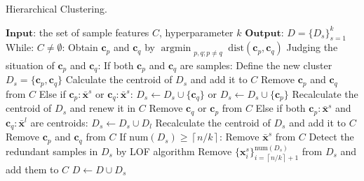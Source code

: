 \documentclass[final,3p,times]{elsarticle}
\begin{document}
 \begin{algorithm}
  \caption{Hierarchical Clustering.}\label{alg:alg1}
  \begin{algorithmic}
  \STATE 
  \STATE $\mathbf{Input}$: the set of sample features $C$, hyperparameter $k$
  \STATE $\mathbf{Output}$: $D=\{D_s\}_{s=1}^k$
  \vspace{5pt} %
  \STATE While: $C\neq\emptyset$:
  \STATE \hspace{0.5cm}Obtain $\boldsymbol{c}_p$ and $\boldsymbol{c}_q$ by $\mathop{\text{argmin}}_{\substack{p, q ; p \neq  {q}}}\text{dist}(\boldsymbol{c}_p,\boldsymbol{c}_q)$
  \STATE \hspace{0.5cm}Judging the situation of $\boldsymbol{c}_p$ and $\boldsymbol{c}_q$:
  \STATE \hspace{1.0cm}If both $\boldsymbol{c}_p$ and $\boldsymbol{c}_q$ are samples:
  \STATE \hspace{1.5cm}Define the new cluster $D_s=\{\boldsymbol{c}_p,\boldsymbol{c}_q\}$
  \STATE \hspace{1.5cm}Calculate the centroid of $D_s$ and add it to $C$
  \STATE \hspace{1.5cm}Remove $\boldsymbol{c}_p$ and $\boldsymbol{c}_q$ from $C$
  \STATE \hspace{1.0cm}Else if $\boldsymbol{c}_p:\bar{\boldsymbol{x}}^s$ or $\boldsymbol{c}_q:{\bar{\boldsymbol{x}}^s}$:
  \STATE \hspace{1.5cm}$D_s\leftarrow D_s {\cup} \{{\boldsymbol{c}}_q\}$ or $D_s\leftarrow D_s {\cup} \{{\boldsymbol{c}}_p\}$
  \STATE \hspace{1.5cm}Recalculate the centroid of $D_s$ and renew it in $C$
  \STATE \hspace{1.5cm}Remove $\boldsymbol{c}_q$ or $\boldsymbol{c}_p$ from $C$
  \STATE \hspace{1.0cm}Else if both $\boldsymbol{c}_p:{\bar{\boldsymbol{x}}^s}$ and $\boldsymbol{c}_q:{\bar{\boldsymbol{x}}^l}$ are centroids:
  \STATE \hspace{1.5cm}$D_s \leftarrow D_s  {\cup}  D_l$
  \STATE \hspace{1.5cm}Recalculate the centroid of $D_s$ and add it to $C$
  \STATE \hspace{1.5cm}Remove $\boldsymbol{c}_p$ and $\boldsymbol{c}_q$ from $C$
  \STATE \hspace{0.5cm}If $\text{num}(D_s)\ge \left\lceil n/k\right\rceil$:
  \STATE \hspace{1.0cm}Remove $\bar{\boldsymbol{x}}^s$ from $C$
  \STATE \hspace{1.0cm}Detect the redundant samples in $D_s$ by LOF algorithm
  \STATE \hspace{1.0cm}Remove $\{\boldsymbol{x}^s_i\}_{i=\left\lceil n/k\right\rceil+1}^{\text{num}(D_s)}$ from $D_s$ and add them to $C$
  \STATE \hspace{1.0cm}$D \leftarrow D  {\cup}  D_s$
  \end{algorithmic}
  \label{Alg1}
\end{algorithm}
\end{document}
